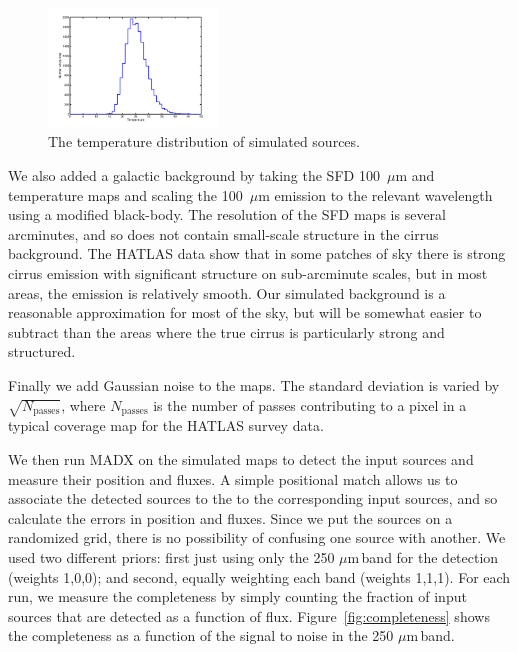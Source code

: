 \documentclass[useAMS,usenatbib]{mn2e}
\def\mic{ $\mu $m\,}
\begin{document}
\begin{figure} 

\includegraphics[width=0.4\textwidth]{Temp_dist.pdf} 
\caption{The temperature distribution of simulated sources. 
\label{fig:Tdist}}
\end{figure}

We also added a galactic background by taking the SFD 100~$\mu$m and
temperature maps and scaling the 100~$\mu$m emission to the relevant
wavelength using a modified black-body. The resolution of the SFD maps
is several arcminutes, and so does not contain small-scale structure
in the cirrus background. The HATLAS data show that in some patches of
sky there is strong cirrus emission with significant structure on
sub-arcminute scales, but in most areas, the emission is relatively
smooth. Our simulated background is a reasonable approximation for
most of the sky, but will be somewhat easier to subtract than the
areas where the true cirrus is particularly strong and structured.

Finally we add Gaussian noise to the maps. The standard deviation is
varied by $\sqrt{N_\mathrm{passes}}$, where $N_\mathrm{passes}$ is
the number of passes contributing to a pixel in a typical coverage map
for the HATLAS survey data.

We then run MADX on the simulated maps to detect the input sources and
measure their position and fluxes. A simple positional match allows us
to associate the detected sources to the to the corresponding input
sources, and so calculate the errors in position and fluxes. Since we
put the sources on a randomized grid, there is no possibility of
confusing one source with another. We used two different priors: first
just using only the 250\mic band for the detection (weights 1,0,0);
and second, equally weighting each band (weights 1,1,1). For each run,
we measure the completeness by simply counting the fraction of input
sources that are detected as a function of
flux. Figure~\ref{fig:completeness} shows the completeness as a
function of the signal to noise in the 250\mic band.
\end{document}
